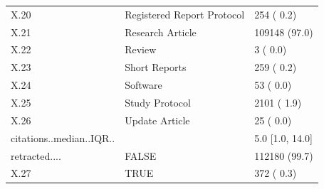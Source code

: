 \begin{table}[ht]
\begin{tabular}{lll}
  X.20 & Registered Report Protocol &    254 ( 0.2)  \\ 
  X.21 & Research Article & 109148 (97.0)  \\ 
  X.22 & Review &      3 ( 0.0)  \\ 
  X.23 & Short Reports &    259 ( 0.2)  \\ 
  X.24 & Software &     53 ( 0.0)  \\ 
  X.25 & Study Protocol &   2101 ( 1.9)  \\ 
  X.26 & Update Article &     25 ( 0.0)  \\ 
  citations..median..IQR.. &  &    5.0 [1.0, 14.0] \\ 
  retracted.... & FALSE & 112180 (99.7)  \\ 
  X.27 & TRUE &    372 ( 0.3)  \\ 
  \end{tabular}
\end{table}
